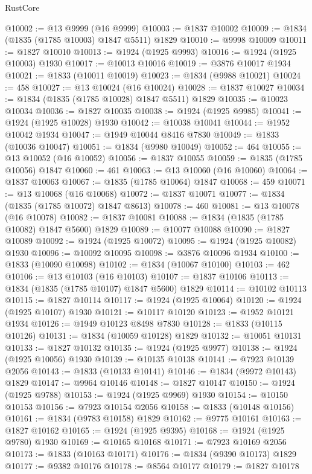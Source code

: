 \begin{lexlean}{RustCore}
\begin{coremodule}
@10002 := @13 @9999 (@16 @9999)
@10003 := @1837 @10002
@10009 := @1834 (@1835 (@1785 @10003) @1847 @5511) @1829
@10010 := @9998 @10009
@10011 := @1827 @10010
@10013 := @1924 (@1925 @9993)
@10016 := @1924 (@1925 @10003) @1930
@10017 := @10013 @10016
@10019 := @3876 @10017 @1934
@10021 := @1833 (@10011 @10019)
@10023 := @1834 (@9988 @10021)
@10024 := 458
@10027 := @13 @10024 (@16 @10024)
@10028 := @1837 @10027
@10034 := @1834 (@1835 (@1785 @10028) @1847 @5511) @1829
@10035 := @10023 @10034
@10036 := @1827 @10035
@10038 := @1924 (@1925 @9985)
@10041 := @1924 (@1925 @10028) @1930
@10042 := @10038 @10041
@10044 := @1952 @10042 @1934
@10047 := @1949 @10044 @8416 @7830
@10049 := @1833 (@10036 @10047)
@10051 := @1834 (@9980 @10049)
@10052 := 464
@10055 := @13 @10052 (@16 @10052)
@10056 := @1837 @10055
@10059 := @1835 (@1785 @10056) @1847
@10060 := 461
@10063 := @13 @10060 (@16 @10060)
@10064 := @1837 @10063
@10067 := @1835 (@1785 @10064) @1847
@10068 := 459
@10071 := @13 @10068 (@16 @10068)
@10072 := @1837 @10071
@10077 := @1834 (@1835 (@1785 @10072) @1847 @8613)
@10078 := 460
@10081 := @13 @10078 (@16 @10078)
@10082 := @1837 @10081
@10088 := @1834 (@1835 (@1785 @10082) @1847 @5600) @1829
@10089 := @10077 @10088
@10090 := @1827 @10089
@10092 := @1924 (@1925 @10072)
@10095 := @1924 (@1925 @10082) @1930
@10096 := @10092 @10095
@10098 := @3876 @10096 @1934
@10100 := @1833 (@10090 @10098)
@10102 := @1834 (@10067 @10100)
@10103 := 462
@10106 := @13 @10103 (@16 @10103)
@10107 := @1837 @10106
@10113 := @1834 (@1835 (@1785 @10107) @1847 @5600) @1829
@10114 := @10102 @10113
@10115 := @1827 @10114
@10117 := @1924 (@1925 @10064)
@10120 := @1924 (@1925 @10107) @1930
@10121 := @10117 @10120
@10123 := @1952 @10121 @1934
@10126 := @1949 @10123 @8498 @7830
@10128 := @1833 (@10115 @10126)
@10131 := @1834 (@10059 @10128) @1829
@10132 := @10051 @10131
@10133 := @1827 @10132
@10135 := @1924 (@1925 @9977)
@10138 := @1924 (@1925 @10056) @1930
@10139 := @10135 @10138
@10141 := @7923 @10139 @2056
@10143 := @1833 (@10133 @10141)
@10146 := @1834 (@9972 @10143) @1829
@10147 := @9964 @10146
@10148 := @1827 @10147
@10150 := @1924 (@1925 @9788)
@10153 := @1924 (@1925 @9969) @1930
@10154 := @10150 @10153
@10156 := @7923 @10154 @2056
@10158 := @1833 (@10148 @10156)
@10161 := @1834 (@9783 @10158) @1829
@10162 := @9775 @10161
@10163 := @1827 @10162
@10165 := @1924 (@1925 @9395)
@10168 := @1924 (@1925 @9780) @1930
@10169 := @10165 @10168
@10171 := @7923 @10169 @2056
@10173 := @1833 (@10163 @10171)
@10176 := @1834 (@9390 @10173) @1829
@10177 := @9382 @10176
@10178 := @8564 @10177
@10179 := @1827 @10178

\end{coremodule}
\end{lexlean}
